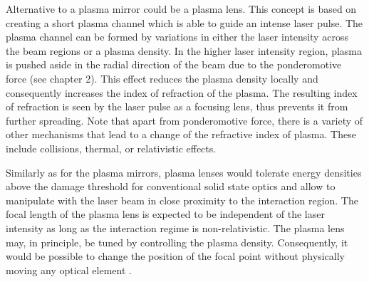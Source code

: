 Alternative to a plasma mirror could be a plasma lens. This concept is based on creating a short plasma channel which is able to guide an intense laser pulse. The plasma channel can be formed by variations in either the laser intensity across the beam regions or a plasma density. In the higher laser intensity region, plasma is pushed aside in the radial direction of the beam due to the ponderomotive force (see chapter 2). This effect reduces the plasma density locally and consequently increases the index of refraction of the plasma. The resulting index of refraction is seen by the laser pulse as a focusing lens, thus prevents it from further spreading. Note that apart from ponderomotive force, there is a variety of other mechanisms that lead to a change of the refractive index of plasma. These include collisions, thermal, or relativistic effects.

Similarly as for the plasma mirrors, plasma lenses would tolerate energy densities above the damage threshold for conventional solid state optics and allow to manipulate with the laser beam in close proximity to the interaction region. The focal length of the plasma lens is expected to be independent of the laser intensity as long as the interaction regime is non-relativistic. The plasma lens may, in principle, be tuned by controlling the plasma density. Consequently, it would be possible to change the position of the focal point without physically moving any optical element \cite{Katzir2009, Fang2006}.